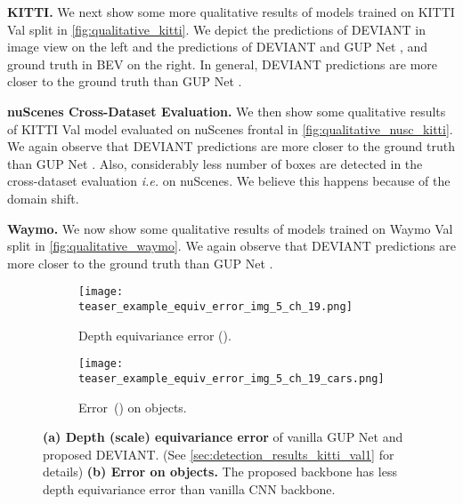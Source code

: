 \documentclass[runningheads]{llncs}
\newcommand{\equivariance}{equivariance}
\newcommand{\kitti}{KITTI}
\newcommand{\nuscenes}{nuScenes}
\newcommand{\waymo}{Waymo}
\newcommand{\valOne}{Val}
\newcommand{\val}{Val}
\newcommand{\gupNet}{GUP Net}
\newcommand{\thatIs}{\textit{i.e.}}
\newcommand{\noIndentHeading}[1]{\noindent\textbf{#1}}
\newcommand{\methodName}{DEVIANT}
\begin{document}
\noIndentHeading{\kitti{}.}
            We next show some more qualitative results of models trained on \kitti{} \valOne{} split in \cref{fig:qualitative_kitti}. 
            We depict the predictions of \methodName{} in image view on the left and the predictions of \methodName{} and \gupNet{} \cite{lu2021geometry}, and ground truth in BEV on the right. 
            In general, \methodName{} predictions are more closer to the ground truth than \gupNet{} \cite{lu2021geometry}.
            
\noIndentHeading{\nuscenes{} Cross-Dataset Evaluation.}
            We then show some qualitative results of \kitti{} \valOne{} model evaluated on \nuscenes{} frontal in \cref{fig:qualitative_nusc_kitti}. 
            We again observe that \methodName{} predictions are more closer to the ground truth than \gupNet{} \cite{lu2021geometry}.
            Also, considerably less number of boxes are detected in the cross-dataset evaluation \thatIs{} on \nuscenes{}. 
            We believe this happens because of the domain shift.
            
\noIndentHeading{\waymo{}.}
            We now show some qualitative results of models trained on \waymo{} \val{} split in \cref{fig:qualitative_waymo}. 
            We again observe that \methodName{} predictions are more closer to the ground truth than \gupNet{} \cite{lu2021geometry}.
            
    \begin{figure}[!tb]
        \centering
        \begin{subfigure}[align=bottom]{.548\linewidth}
              \centering
              \texttt{[image: teaser\_example\_equiv\_error\_img\_5\_ch\_19.png]}
              \caption{Depth \equivariance{} error (\downarrowRHDSmall).}
              \label{fig:equiv_error_qualitative}
        \end{subfigure}
        \begin{subfigure}[align=bottom]{.38\linewidth}
            \centering
            \texttt{[image: teaser\_example\_equiv\_error\_img\_5\_ch\_19\_cars.png]}
            \caption{Error~(\downarrowRHDSmall) on objects.}
            \label{fig:equiv_error_qualitative_object}
        \end{subfigure}
        \caption{
        \textbf{(a) Depth (scale) \equivariance{} error } of vanilla \gupNet{} \cite{lu2021geometry} and proposed \methodName{}. (See \cref{sec:detection_results_kitti_val1} for details)
        \textbf{(b) Error on objects.} The proposed backbone has less depth \equivariance{} error than vanilla CNN backbone.
        }
        \label{fig:equiv_error_qualitative_both}
    \end{figure}    
            
\end{document}
